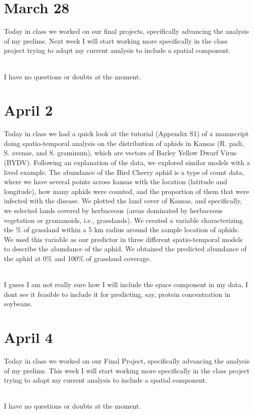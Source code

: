 \documentclass[
]{book}
\begin{document}
\hypertarget{march-28}{%
\section{March 28}\label{march-28}}

Today in class we worked on our final projects, specifically advancing the analysis of my prelims. Next week I will start working more specifically in the class project trying to adapt my current analysis to include a spatial component.\\
\strut \\
I have no questions or doubts at the moment.

\hypertarget{april-2}{%
\section{April 2}\label{april-2}}

Today in class we had a quick look at the tutorial (Appendix S1) of a manuscript doing spatio-temporal analysis on the distribution of aphids in Kansas (R. padi, S. avenae, and S. graminum), which are vectors of Barley Yellow Dwarf Virus (BYDV). Following an explanation of the data, we explored similar models with a lived example. The abundance of the Bird Cherry aphid is a type of count data, where we have several points across kansas with the location (latitude and longitude), how many aphids were counted, and the proportion of them that were infected with the disease. We plotted the land cover of Kansas, and specifically, we selected lands covered by herbaceous (areas dominated by herbaceous vegetation or gramanoids, i.e., grasslands). We created a variable characterizing the \% of grassland within a 5 km radius around the sample location of aphids. We used this variable as our predictor in three different spatio-temporal models to describe the abundance of the aphid. We obtained the predicted abundance of the aphid at 0\% and 100\% of grassland coverage.\\
\strut \\
I guess I am not really sure how I will include the space component in my data, I dont see it feasible to include it for predicting, say, protein concentration in soybeans.

\hypertarget{april-4}{%
\section{April 4}\label{april-4}}

Today in class we worked on our Final Project, specifically advancing the analysis of my prelims. This week I will start working more specifically in the class project trying to adapt my current analysis to include a spatial component.\\
\strut \\
I have no questions or doubts at the moment.
\end{document}
